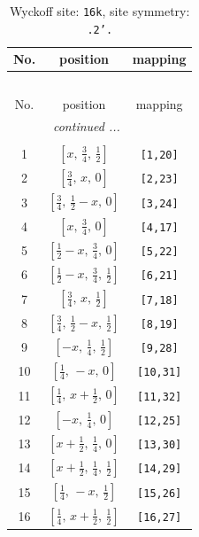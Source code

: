 \documentclass[fleqn,8pt]{jsarticle}
\begin{document}
\renewcommand{\arraystretch}{1.2}
\begin{longtable}{ccc}
\caption{Wyckoff site: {\tt 16k}, site symmetry: {\tt .2'.}}
 \\
 \hline \hline
No. & position & mapping \\ \hline \endfirsthead

\multicolumn{2}{l}{\tablename\ \thetable{}} \\
 \hline \hline
No. & position & mapping \\ \hline \endhead

 \hline \hline
\multicolumn{2}{r}{\footnotesize\it continued ...} \\ \endfoot

 \hline \hline
\multicolumn{2}{r}{} \\ \endlastfoot

1 & $\left[ x,\, \frac{3}{4},\, \frac{1}{2} \right]$ & {\tt [1,20]} \\ \hline
2 & $\left[ \frac{3}{4},\, x,\, 0 \right]$ & {\tt [2,23]} \\ \hline
3 & $\left[ \frac{3}{4},\, \frac{1}{2} - x,\, 0 \right]$ & {\tt [3,24]} \\ \hline
4 & $\left[ x,\, \frac{3}{4},\, 0 \right]$ & {\tt [4,17]} \\ \hline
5 & $\left[ \frac{1}{2} - x,\, \frac{3}{4},\, 0 \right]$ & {\tt [5,22]} \\ \hline
6 & $\left[ \frac{1}{2} - x,\, \frac{3}{4},\, \frac{1}{2} \right]$ & {\tt [6,21]} \\ \hline
7 & $\left[ \frac{3}{4},\, x,\, \frac{1}{2} \right]$ & {\tt [7,18]} \\ \hline
8 & $\left[ \frac{3}{4},\, \frac{1}{2} - x,\, \frac{1}{2} \right]$ & {\tt [8,19]} \\ \hline
9 & $\left[ - x,\, \frac{1}{4},\, \frac{1}{2} \right]$ & {\tt [9,28]} \\ \hline
10 & $\left[ \frac{1}{4},\, - x,\, 0 \right]$ & {\tt [10,31]} \\ \hline
11 & $\left[ \frac{1}{4},\, x + \frac{1}{2},\, 0 \right]$ & {\tt [11,32]} \\ \hline
12 & $\left[ - x,\, \frac{1}{4},\, 0 \right]$ & {\tt [12,25]} \\ \hline
13 & $\left[ x + \frac{1}{2},\, \frac{1}{4},\, 0 \right]$ & {\tt [13,30]} \\ \hline
14 & $\left[ x + \frac{1}{2},\, \frac{1}{4},\, \frac{1}{2} \right]$ & {\tt [14,29]} \\ \hline
15 & $\left[ \frac{1}{4},\, - x,\, \frac{1}{2} \right]$ & {\tt [15,26]} \\ \hline
16 & $\left[ \frac{1}{4},\, x + \frac{1}{2},\, \frac{1}{2} \right]$ & {\tt [16,27]} \\
\end{longtable}
\end{document}
